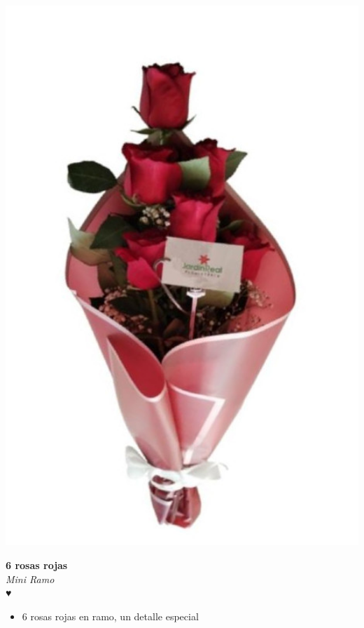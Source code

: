 \documentclass[12pt]{article}
\begin{document}
\vspace{1cm}
\noindent
\begin{minipage}{0.35\textwidth}
    \includegraphics[width=1.0\textwidth]{imagenes_extraidas/image_6_2}
\end{minipage}
\hspace{1cm}
\begin{minipage}{0.6\textwidth}
    \textcolor[HTML]{FF8C00}{\textbf{\huge 6 rosas rojas }}\\
    {\textit{Mini Ramo}} \\
    \textcolor[HTML]{FF8C00}{\Huge ♥} \\
    \vspace{0.5cm}
    \begin{itemize}
        \item 6 rosas rojas en ramo, un detalle especial
    \end{itemize}
\end{minipage}
\end{document}
